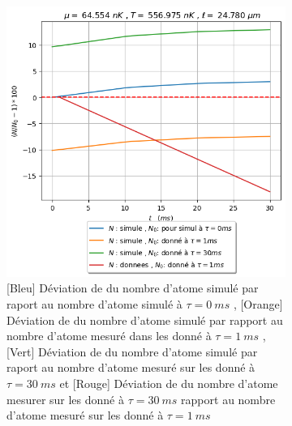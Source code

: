 \documentclass[a3, 10pt,twoside]{article}          %
\theoremstyle{plain}
\theoremstyle{definition}
\theoremstyle{remark}
\theoremstyle{definition} %
\def\OliveGreen{OliveGreen}
\begin{document}
\begin{figure}[H]
\begin{subfigure}[b]{0.45\textwidth}
        		\includegraphics[width=\textwidth]{Figures/Nat}
        		\caption{{\color{blue}[Bleu] Déviation de du nombre d'atome simulé par raport au nombre d'atome simulé à $\tau = 0 ~ms$ } , {\color{orange}[Orange] Déviation de du nombre d'atome simulé par rapport au nombre d'atome mesuré dans les donné à $\tau = 1 ~ms$} ,  {\color{\OliveGreen}[Vert] Déviation de du nombre d'atome simulé par raport au nombre d'atome mesuré sur les donné à $\tau = 30 ~ms$} et {\color{red}[Rouge] Déviation de du nombre d'atome mesurer sur les donné à $\tau = 30 ~ms$ rapport au nombre d'atome mesuré sur les donné à $\tau = 1 ~ms$} }
        		\label{fig4:nat}
    		\end{subfigure}
    		
    		\caption{}
				
		\end{figure}
		
\end{document}
